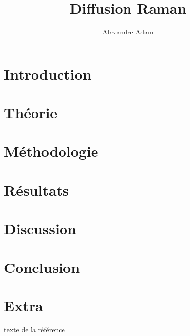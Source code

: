 \documentclass[10pt,letterpaper,twocolumn]{article}
\title{\vspace{-10mm}\Large
Diffusion Raman %
\vspace{-4mm}}
\author{\large
Alexandre Adam
}
\date{\vspace{-8mm}}
\begin{document}
\twocolumn[
\maketitle
\begin{onecolabstract} %

\vspace{4mm} %
\end{onecolabstract}
]

\section{Introduction}\label{intro} %


\section{Théorie}\label{sec:theorie} %


\section{Méthodologie}\label{sec:metho} %


\section{Résultats}\label{sec:resultats} %

\section{Discussion}\label{sec:discuss} %

\section{Conclusion}\label{sec:conclusion} %

\section{Extra} %


\begin{thebibliography}{1}
 texte de la référence
\end{thebibliography}
\end{document}
